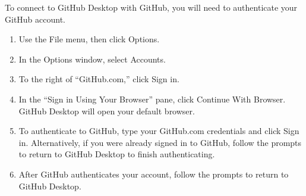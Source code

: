 \documentclass[
  letterpaper,
  DIV=11,
  numbers=noendperiod]{scrreprt}
\providecommand{\tightlist}{%
  \setlength{\itemsep}{0pt}\setlength{\parskip}{0pt}}\usepackage{longtable,booktabs,array}
\begin{document}
To connect to GitHub Desktop with GitHub, you will need to authenticate
your GitHub account.

\begin{enumerate}
\def\labelenumi{\arabic{enumi}.}
\tightlist
\item
  Use the File menu, then click Options.
\item
  In the Options window, select Accounts.
\item
  To the right of ``GitHub.com,'' click Sign in.
\item
  In the ``Sign in Using Your Browser'' pane, click Continue With
  Browser. GitHub Desktop will open your default browser.
\item
  To authenticate to GitHub, type your GitHub.com credentials and click
  Sign in. Alternatively, if you were already signed in to GitHub,
  follow the prompts to return to GitHub Desktop to finish
  authenticating.
\item
  After GitHub authenticates your account, follow the prompts to return
  to GitHub Desktop.
\end{enumerate}
\end{document}

